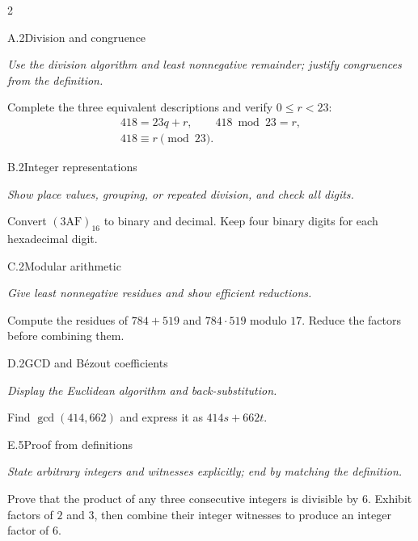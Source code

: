 \documentclass[9pt]{extarticle}
\begin{document}
\begin{multicols}{2}
\begin{CoreProblem}{A.2}{Division and congruence}
{\scriptsize\textit{Use the division algorithm and least nonnegative remainder; justify congruences from the definition.}\par}
Complete the three equivalent descriptions and verify $0\le r<23$:
\[
\begin{gathered}
418=23q+r,\qquad 418\bmod 23=r,\\
418\equiv r\pmod{23}.
\end{gathered}
\]
\end{CoreProblem}
\begin{CoreProblem}{B.2}{Integer representations}
{\scriptsize\textit{Show place values, grouping, or repeated division, and check all digits.}\par}
Convert $(\mathrm{3AF})_{16}$ to binary and decimal. Keep four binary digits
for each hexadecimal digit.
\end{CoreProblem}
\begin{CoreProblem}{C.2}{Modular arithmetic}
{\scriptsize\textit{Give least nonnegative residues and show efficient reductions.}\par}
Compute the residues of $784+519$ and $784\cdot519$ modulo $17$. Reduce the
factors before combining them.
\end{CoreProblem}
\columnbreak
\begin{CoreProblem}{D.2}{GCD and B\'ezout coefficients}
{\scriptsize\textit{Display the Euclidean algorithm and back-substitution.}\par}
Find $\gcd(414,662)$ and express it as $414s+662t$.
\end{CoreProblem}
\begin{CoreProblem}{E.5}{Proof from definitions}
{\scriptsize\textit{State arbitrary integers and witnesses explicitly; end by matching the definition.}\par}
Prove that the product of any three consecutive integers is divisible by $6$.
Exhibit factors of $2$ and $3$, then combine their integer witnesses to
produce an integer factor of $6$.
\end{CoreProblem}
\end{multicols}
\CoreWorkArea
\FormBreak
{}
\end{document}
